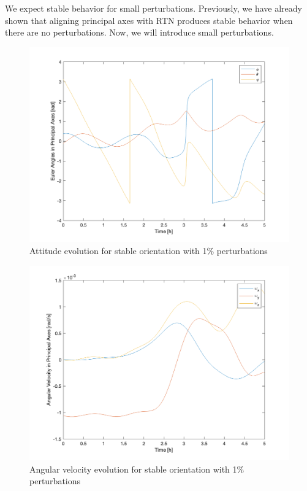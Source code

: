 We expect stable behavior for small perturbations. Previously, we have already shown that aligning principal axes with RTN produces stable behavior when there are no perturbations. Now, we will introduce small perturbations.

\begin{figure}[H]
\centering
\includegraphics[scale=0.6]{Images/ps5_problem1b_angle.png}
\caption{Attitude evolution for stable orientation with 1\% perturbations}
\label{fig:ps5_problem1b_angle}
\end{figure}

\begin{figure}[H]
\centering
\includegraphics[scale=0.6]{Images/ps5_problem1b_angvel.png}
\caption{Angular velocity evolution for stable orientation with 1\% perturbations}
\label{fig:ps5_problem1b_angvel}
\end{figure}

